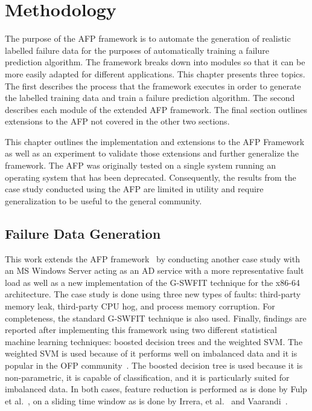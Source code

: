 \chapter{Methodology} \label{chapter3}
The purpose of the \ac{AFP} framework is to automate the generation of
realistic labelled failure data for the purposes of automatically training a
failure prediction algorithm.  The framework breaks down into modules so that
it can be more easily adapted for different applications.  This chapter
presents three topics.  The first describes the process that the framework
executes in order to generate the labelled training data and train a failure
prediction algorithm.  The second describes each module of the extended
\ac{AFP} framework.  The final section outlines extensions to the \ac{AFP} not
covered in the other two sections.

This chapter outlines the implementation and extensions to the \ac{AFP}
Framework~\cite{irrera2015} as well as an experiment to validate those
extensions and further generalize the framework.  The \ac{AFP} was originally tested
on a single system running an operating system that has been deprecated.
Consequently, the results from the case study conducted using the \ac{AFP} are
limited in utility and require generalization to be useful to the general
community.

\section{Failure Data Generation} \label{sec:generation}
This work extends the \ac{AFP} framework~\cite{irrera2015} by conducting
another case study with an \ac{MS} Windows Server acting as an \ac{AD} service
with a more representative fault load as well as a new implementation of the
\ac{G-SWFIT} technique for the x86-64 architecture.  The case study is done
using three new types of faults: third-party memory leak, third-party \ac{CPU}
hog, and process memory corruption.  For completeness, the standard
\ac{G-SWFIT} technique is also used.  Finally, findings are reported after
implementing this framework using two different statistical machine learning
techniques: boosted decision trees and the weighted \ac{SVM}.  The weighted
\ac{SVM} is used because of it performs well on imbalanced data and it is
popular in the \ac{OFP} community~\cite{salfnerSurvey}.  The boosted decision
tree is used because it is non-parametric, it is capable of classification, and
it is particularly suited for imbalanced data.  In both cases, feature
reduction is performed as is done by Fulp et al.~\cite{fulp2008}, on a sliding
time window as is done by Irrera, et al.~\cite{irrera2013a} and
Vaarandi~\cite{vaarandi2002}.

